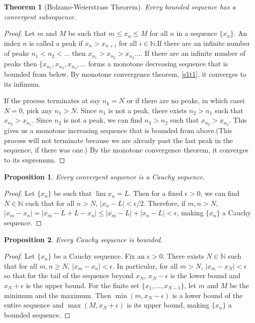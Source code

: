 \documentclass{article}
\theoremstyle{plain}
\newtheorem{thm}{Theorem}
\numberwithin{thm}{section}
\theoremstyle{plain}
\newtheorem{prop}{Proposition}
\numberwithin{prop}{section}
\theoremstyle{definition}
\numberwithin{defn}{section}
\theoremstyle{remark}
\numberwithin{equation}{section}
\begin{document}
\begin{thm}[Bolzano-Weierstrass Theorem]\label{s1t2}
Every bounded sequence has a convergent subsequence.
\end{thm}
\begin{proof}
Let $m$ and $M$ be such that $m \le x_n \le M$ for all $n$ in a sequence 
$\{x_n\}$. An index $n$ is called a peak if $x_n > x_{n + i}$ for all $i \in
\mathbb{N}$.If there are an infinite number of peaks $n_1 < n_2 < \ldots$ then
$x_{n_1} > x_{n_2} > x_{n_3} \ldots$. If there are an infinite number of peaks 
then $\{x_{n_1}, x_{n_2}, x_{n_3}, \ldots$ forms a monotone decreasing sequence
that is bounded from below. By monotone convergence theorem, \ref{s1t1}, it 
converges to its infimum. 

If the process terminates at say $n_k = N$ or if there are no peaks, in which 
casei $N=0$, pick any $n_1 > N$. Since $n_1$ is not a peak, there exists $n_2 
> n_1$ such that $x_{n_2} > x_{n_1}$. Since $n_2$ is not a peak, we can find 
$n_3 > n_2$ such that $x_{n_3} > x_{n_2}$. This gives us a monotone increasing
sequence that is bounded from above.(This process will not terminate because
we are already past the last peak in the sequence, if there was one.) By the 
monotone convergence theorem, it converges to its supremum.
\end{proof}

\begin{prop}\label{s1p2}
Every convergent sequence is a Cauchy sequence.
\end{prop}
\begin{proof}
Let $\{x_n\}$ be such that $\lim x_n = L$. Then for a fixed $\epsilon > 0$, we
can find $N \in \mathbb{N}$ such that for all $n > N$, $|x_n - L| < \epsilon/2$.
Therefore, if $m, n > N$, $|x_m - x_n| = |x_m - L + L - x_n| \le |x_m - L| + 
|x_n - L| < \epsilon$, making $\{x_n\}$ a Cauchy sequence.
\end{proof}

\begin{prop}\label{s1p3}
Every Cauchy sequence is bounded.
\end{prop}
\begin{proof}
Let $\{x_n\}$ be a Cauchy sequence. Fix an $\epsilon > 0$. There exists $N \in
\mathbb{N}$ such that for all $m, n \ge N$, $|x_m - x_n| < \epsilon$. In 
particular, for all $m > N$, $|x_m - x_N| < \epsilon$ so that for the tail of
the sequence beyond $x_N$, $x_N - \epsilon$ is the lower bound and $x_N +
\epsilon$ is the upper bound. For the finite set $\{x_1, \ldots, x_{N-1}\}$, let
$m$ and $M$ be the minimum and the maximum. Then $\min(m, x_N - \epsilon)$ is
a lower bound of the entire sequence and $\max(M, x_N + \epsilon)$ is its upper
bound, making $\{x_n\}$ a bounded sequence.
\end{proof}
\end{document}
